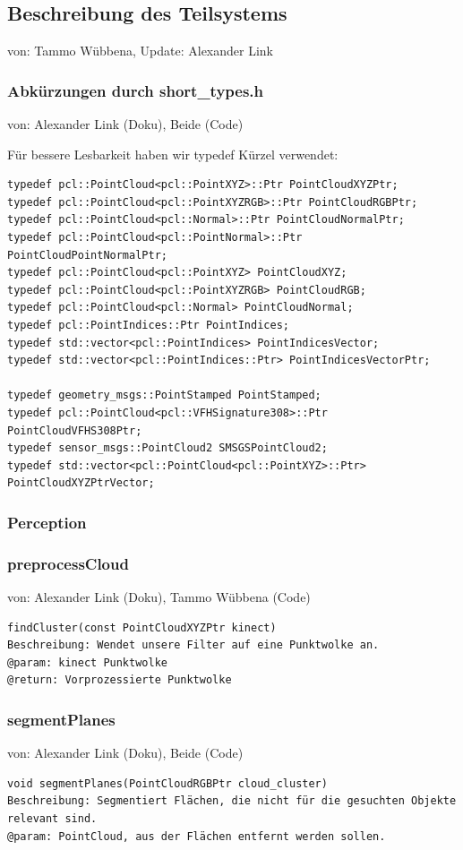 \documentclass{suturo}
\makeatletter
\newcommand{\chapterauthor}[1]{%
  {\parindent0pt\vspace*{-27pt}%
  \linespread{0}\small\begin{flushright}von: #1\end{flushright}%
  \par\nobreak\vspace*{0pt}}
  \@afterheading%
}
\makeatother
\begin{document}
\subsection{Beschreibung des Teilsystems}
\chapterauthor{Tammo Wübbena, Update: Alexander Link}

\subsubsection{Abkürzungen durch short\_types.h}
\chapterauthor{Alexander Link (Doku), Beide (Code)}
Für bessere Lesbarkeit haben wir typedef Kürzel verwendet:
\begin{verbatim}
typedef pcl::PointCloud<pcl::PointXYZ>::Ptr PointCloudXYZPtr;
typedef pcl::PointCloud<pcl::PointXYZRGB>::Ptr PointCloudRGBPtr;
typedef pcl::PointCloud<pcl::Normal>::Ptr PointCloudNormalPtr;
typedef pcl::PointCloud<pcl::PointNormal>::Ptr PointCloudPointNormalPtr;
typedef pcl::PointCloud<pcl::PointXYZ> PointCloudXYZ;
typedef pcl::PointCloud<pcl::PointXYZRGB> PointCloudRGB;
typedef pcl::PointCloud<pcl::Normal> PointCloudNormal;
typedef pcl::PointIndices::Ptr PointIndices;
typedef std::vector<pcl::PointIndices> PointIndicesVector;
typedef std::vector<pcl::PointIndices::Ptr> PointIndicesVectorPtr;

typedef geometry_msgs::PointStamped PointStamped;
typedef pcl::PointCloud<pcl::VFHSignature308>::Ptr PointCloudVFHS308Ptr;
typedef sensor_msgs::PointCloud2 SMSGSPointCloud2;
typedef std::vector<pcl::PointCloud<pcl::PointXYZ>::Ptr> PointCloudXYZPtrVector;
\end{verbatim}

\subsubsection*{Perception}

\subsubsection{preprocessCloud}
\chapterauthor{Alexander Link (Doku), Tammo Wübbena (Code)}
\begin{verbatim}
findCluster(const PointCloudXYZPtr kinect)
Beschreibung: Wendet unsere Filter auf eine Punktwolke an.
@param: kinect Punktwolke
@return: Vorprozessierte Punktwolke
\end{verbatim}\label{func:preprocesscloud}

\subsubsection{segmentPlanes}
\chapterauthor{Alexander Link (Doku), Beide (Code)}
\begin{verbatim}
void segmentPlanes(PointCloudRGBPtr cloud_cluster)
Beschreibung: Segmentiert Flächen, die nicht für die gesuchten Objekte
relevant sind.
@param: PointCloud, aus der Flächen entfernt werden sollen.
\end{verbatim}\label{func:segmentplanes}
\end{document}
